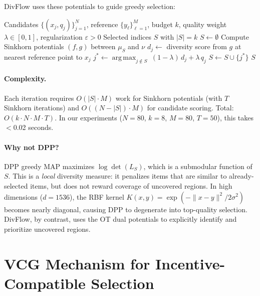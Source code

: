 \documentclass[10pt]{article}
\DeclareMathOperator*{\argmax}{arg\,max}
\begin{document}
DivFlow uses these potentials to guide greedy selection:

\begin{algorithm}[H]
\caption{DivFlow: Sinkhorn-Guided Diverse Selection}
\label{alg:divflow}
\begin{algorithmic}[1]
\REQUIRE Candidates $\{(x_j, q_j)\}_{j=1}^N$, reference $\{y_\ell\}_{\ell=1}^M$, budget $k$, quality weight $\lambda \in [0,1]$, regularization $\varepsilon > 0$
\ENSURE Selected indices $S$ with $|S| = k$
\STATE $S \leftarrow \emptyset$
  \STATE Compute Sinkhorn potentials $(f, g)$ between $\mu_S$ and $\nu$
    \STATE $d_j \leftarrow$ diversity score from $g$ at nearest reference point to $x_j$
  \ENDFOR
  \STATE $j^* \leftarrow \argmax_{j \notin S}\; (1-\lambda)\, d_j + \lambda\, q_j$
  \STATE $S \leftarrow S \cup \{j^*\}$
\ENDFOR
\RETURN $S$
\end{algorithmic}
\end{algorithm}

\paragraph{Complexity.}
Each iteration requires $O(|S| \cdot M)$ work for Sinkhorn potentials (with $T$ Sinkhorn iterations) and $O((N - |S|) \cdot M)$ for candidate scoring. Total: $O(k \cdot N \cdot M \cdot T)$.
In our experiments ($N=80$, $k=8$, $M=80$, $T=50$), this takes $<$0.02 seconds.

\paragraph{Why not DPP?}
DPP greedy MAP maximizes $\log\det(L_S)$, which is a submodular function of $S$.
This is a \emph{local} diversity measure: it penalizes items that are similar to already-selected items, but does not reward coverage of uncovered regions.
In high dimensions ($d=1536$), the RBF kernel $K(x,y) = \exp(-\|x-y\|^2/2\sigma^2)$ becomes nearly diagonal, causing DPP to degenerate into top-quality selection.
DivFlow, by contrast, uses the OT dual potentials to explicitly identify and prioritize uncovered regions.

\section{VCG Mechanism for Incentive-Compatible Selection}
\label{sec:vcg}
\end{document}
